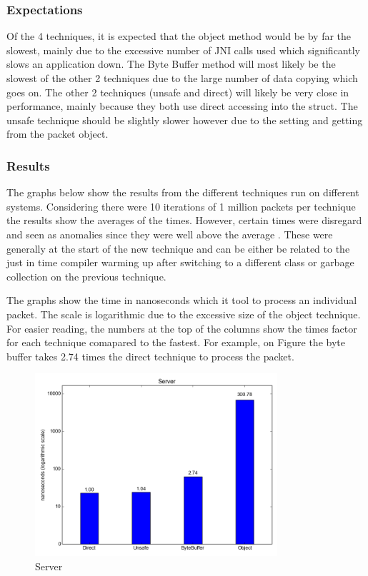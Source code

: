\documentclass[final_report.tex]{subfiles}
\begin{document}
\subsubsection{Expectations}
Of the 4 techniques, it is expected that the object method would be by far the slowest, mainly due to the excessive number of JNI calls used which significantly slows an application down. The Byte Buffer method will most likely be the slowest of the other 2 techniques due to the large number of data copying which goes on. The other 2 techniques (unsafe and direct) will likely be very close in performance, mainly because they both use direct accessing into the struct. The unsafe technique should be slightly slower however due to the setting and getting from the packet object.


\subsubsection{Results}
The graphs below show the results from the different techniques run on different systems. Considering there were 10 iterations of 1 million packets per technique the results show the averages of the times. However, certain times were disregard and seen as anomalies since they were well above the average . These were generally at the start of the new technique and can be either be related to the just in time compiler warming up after switching to a different class or garbage collection on the previous technique.

The graphs show the time in nanoseconds which it tool to process an individual packet. The scale is logarithmic due to the excessive size of the object technique. For easier reading, the numbers at the top of the columns show the times factor for each technique comapared to the fastest. For example, on Figure  the byte buffer takes 2.74 times the direct technique to process the packet.

\begin{figure}[H]
	\centering
	\includegraphics[width=0.8\textwidth]{img/server.png}
	\caption{Server}
	\label{fig:layers}
\end{figure}
\end{document}
